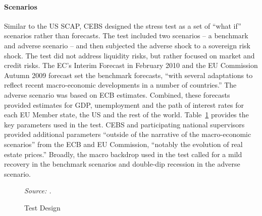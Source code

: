 \documentclass[12pt]{article}
\begin{document}
\paragraph{Scenarios}

Similar to the US SCAP, CEBS designed the stress test as a set of ``what if'' scenarios rather than forecasts. The test included two scenarios -- a benchmark and adverse scenario -- and then subjected the adverse shock to a sovereign risk shock. The test did not address liquidity risks, but rather focused on market and credit risks. The EC's Interim Forecast in February 2010 and the EU Commission Autumn 2009 forecast set the benchmark forecasts, ``with several adaptations to reflect recent macro-economic developments in a number of countries.'' The adverse scenario was based on ECB estimates.  Combined, these forecasts provided estimates for GDP, unemployment and the path of interest rates for each EU Member state, the US and the rest of the world. Table~\ref{design} provides the key parameters used in the test. CEBS and participating national supervisors provided additional parameters ``outside of the narrative of the macro-economic scenarios'' from the ECB and EU Commission, ``notably the evolution of real estate prices.'' Broadly, the macro backdrop used in the test called for a mild recovery in the benchmark scenarios and double-dip recession in the adverse scenario.


\begin{figure}[h]
\caption{Test Design}\label{design}
\noindent
{}%

\textit{\footnotesize Source: \citet{Deutsche}.}
\end{figure}
\end{document}
